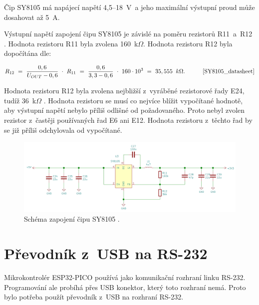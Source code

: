   Čip SY8105 má napájecí napětí 4,5--18~V~a jeho maximální výstupní proud může dosahovat až 5~A.

  Výstupní napětí zapojení čipu SY8105 je závislé na poměru rezistorů R11~a~R12 \cite{SY8105_datasheet}. 
  Hodnota rezistoru R11 byla zvolena 160~k$\Omega$. Hodnota rezistoru R12 byla dopočítána dle:

  \begin{equation} 
    R_{12}~=~\frac{0,6}{U_{OUT}-0,6}~\cdot~R_{11}~=~\frac{0,6}{3,3-0,6}~\cdot~160\cdot10^3~=~35,555~\:k\Omega. 
    \quad \quad \quad \cite{SY8105_datasheet}
  \label{eq:R12}
  \end{equation}

  Hodnota rezistoru R12 byla zvolena nejbližší z~vyráběné rezistorové řady E24, tudíž 36~k$\Omega$ \cite{Rezistorova_rada}. Hodnota 
  rezistoru se musí co nejvíce blížit vypočítané hodnotě, aby výstupní napětí nebylo příliš odlišné od požadovaného. Proto nebyl
  zvolen rezistor z~častěji používaných řad E6 ani E12. Hodnota rezistoru z~těchto řad by se již příliš odchylovala od vypočítané.

  \begin{figure}[!h]
    \begin{center}
      \includegraphics[scale=0.4]{obrazky/SY8105_schema.png}
    \end{center}
    \caption[Schéma zapojení čipu SY8105 \cite{SY8105_datasheet}]{Schéma zapojení čipu SY8105 \cite{SY8105_datasheet}.}
  \end{figure}

  \section{Převodník z~USB na RS-232}
  Mikrokontrolér ESP32-PICO používá jako komunikační rozhraní linku RS-232. Programování ale probíhá přes USB konektor, který toto rozhraní
  nemá. Proto bylo potřeba použít převodník z~USB na rozhraní RS-232.
  

